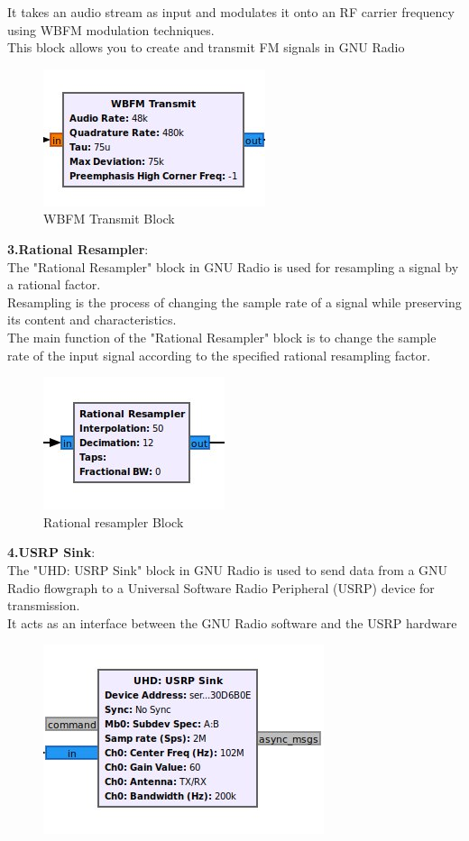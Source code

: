 \begin{enumerate}[label=\arabic*.,ref=\thesection.\theenumi]
It takes an audio stream as input and modulates it onto an RF carrier frequency using WBFM modulation techniques. 
\\
This block allows you to create and transmit FM 
signals in GNU Radio
\begin{figure}[H]
\centering
\includegraphics[width=0.3\columnwidth]{fm/tx-gnu/figs/wbfm-tx.jpg}
\caption{WBFM Transmit Block}
\label{fig:wbfm_tx}
\end{figure}
\textbf{3.Rational Resampler}:\\
The "Rational Resampler" block in GNU Radio is used for resampling a signal by a rational factor.
\\
Resampling is the process of changing the sample rate of a signal while preserving its content and characteristics.
\\
The main function of the "Rational Resampler" block is to change the sample rate of the input signal according to the specified rational 
resampling factor.
\begin{figure}[H]
\centering
\includegraphics[width=0.3\columnwidth]{fm/tx-gnu/figs/resampler.jpg}
\caption{Rational resampler Block}
\label{fig:Rational resampler block}
\end{figure}
\textbf{4.USRP Sink}:\\
The "UHD: USRP Sink" block in GNU Radio is used to send data from a GNU Radio flowgraph to a Universal Software Radio Peripheral (USRP) device for transmission.
\\
It acts as an interface between the GNU Radio software and the USRP hardware
\begin{figure}[H]
\centering
\includegraphics[width=0.3\columnwidth]{fm/tx-gnu/figs/usrp-sink.jpg}

\end{figure}
\end{enumerate}

